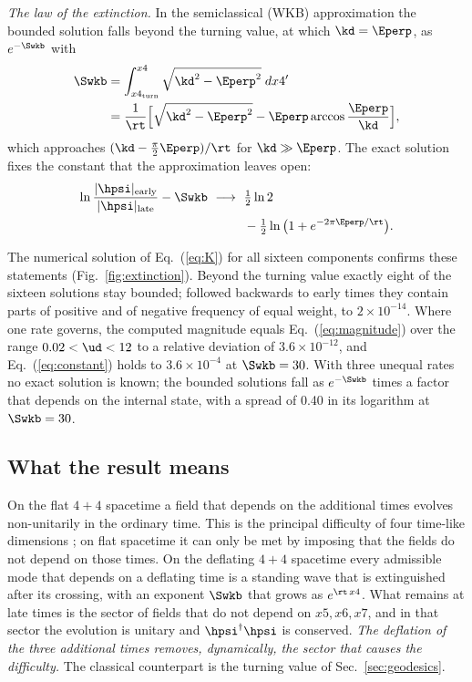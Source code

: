 \emph{The law of the extinction.} In the semiclassical (WKB) approximation the bounded solution
falls beyond the turning value, at which $\kd=\Eperp$, as $e^{-\Swkb}$ with
\begin{align}
\Swkb&=\int_{x4_{\mathrm{turn}}}^{x4}\sqrt{\kd^{2}-\Eperp^{2}}\;dx4'\nonumber\\
&=\frac{1}{\rt}\Big[\sqrt{\kd^{2}-\Eperp^{2}}-\Eperp\arccos\frac{\Eperp}{\kd}\Big],
\label{eq:Swkb}
\end{align}
which approaches $(\kd-\tfrac{\pi}{2}\Eperp)/\rt$ for $\kd\gg\Eperp$. The exact solution fixes the
constant that the approximation leaves open:
\begin{equation}
\begin{aligned}
\ln\frac{|\hpsi|_{\mathrm{early}}}{|\hpsi|_{\mathrm{late}}}-\Swkb\ \longrightarrow\ {}&\tfrac12\ln2\\
&-\tfrac12\ln\big(1+e^{-2\pi\Eperp/\rt}\big).
\end{aligned}
\label{eq:constant}
\end{equation}

The numerical solution of Eq.~(\ref{eq:K}) for all sixteen components confirms these statements
(Fig.~\ref{fig:extinction}). Beyond the turning value exactly eight of the sixteen solutions stay
bounded; followed backwards to early times they contain parts of positive and of negative frequency
of equal weight, to $2\times10^{-14}$. Where one rate governs, the computed magnitude equals
Eq.~(\ref{eq:magnitude}) over the range $0.02<\ud<12$ to a relative deviation of
$3.6\times10^{-12}$, and Eq.~(\ref{eq:constant}) holds to $3.6\times10^{-4}$ at $\Swkb=30$. With
three unequal rates no exact solution is known; the bounded solutions fall as $e^{-\Swkb}$ times a
factor that depends on the internal state, with a spread of 0.40 in its logarithm at $\Swkb=30$.

\subsection{What the result means}

On the flat $4+4$ spacetime a field that depends on the additional times evolves non-unitarily in
the ordinary time. This is the principal difficulty of four time-like dimensions
\cite{Tegmark1997,CraigWeinstein2009}; on flat spacetime it can only be met by imposing that the
fields do not depend on those times. On the deflating $4+4$ spacetime every admissible mode
that depends on a deflating time is a standing wave that is extinguished after its crossing, with an
exponent $\Swkb$ that grows as $e^{\rt\,x4}$. What remains at late times is the sector of fields
that do not depend on $x5,x6,x7$, and in that sector the evolution is unitary and
$\hpsi^\dagger\hpsi$ is conserved. \emph{The deflation of the three additional times removes,
dynamically, the sector that causes the difficulty.} The classical counterpart is the turning value
of Sec.~\ref{sec:geodesics}.

